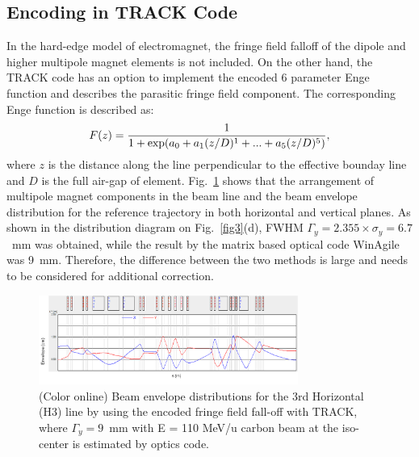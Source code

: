 \documentclass[jkps,preprint,fleqn,showpacs,showkeys,10pt,twocolumn]{revtex4}
\begin{document}
\subsection{Encoding in TRACK Code}
In the hard-edge model of electromagnet, the fringe field falloff of the dipole and higher multipole magnet elements is not included.
On the other hand, the TRACK code has an option to implement the encoded 6 parameter Enge function\cite{Enge}
and describes the parasitic fringe field component.  
The corresponding Enge function is described as\cite{EngeTrack}:
\[
F(z) = \frac{1}{1+{\rm exp}(a_{0}+a_{1}(z/D)^{1}+...+a_{5}(z/D)^{5})}, 
\]
where $z$ is the distance along the line perpendicular to the effective bounday line and $D$ is the full air-gap of element.
Fig.~\ref{fig2} shows that the arrangement of multipole magnet components in the beam line and
the beam envelope distribution for the reference trajectory in both horizontal and vertical planes.
As shown in the distribution diagram on Fig.~\ref{fig3}(d), FWHM $\Gamma_{y} = 2.355 \times \sigma_{y} = 6.7$~mm was obtained,
while the result by the matrix based optical code WinAgile was 9~mm.
Therefore, the difference between the two methods is large and needs to be considered for additional correction.
\begin{figure}[h]
  \begin{center}
    \includegraphics[width=8.5cm]{Fig03.png}      
    \caption{(Color online) Beam envelope distributions for the 3rd Horizontal (H3) line by using the encoded fringe field fall-off with TRACK, 
      where $\Gamma_{y} = 9$~mm with E = 110 MeV/u carbon beam at the iso-center is estimated by optics code.}
    \label{fig2}
  \end{center}
\end{figure}
\end{document}
